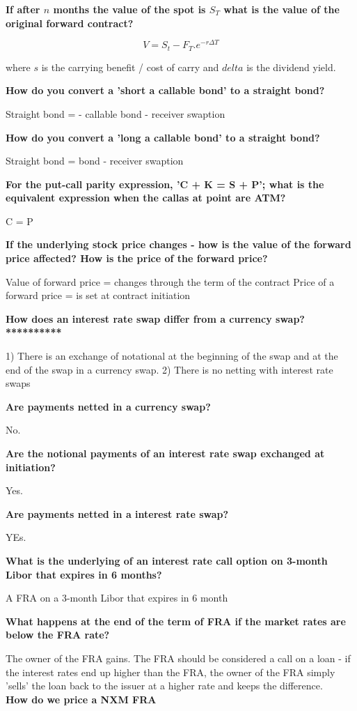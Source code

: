\documentclass[12pt]{article}
\begin{document}
\begin{framed}
		\textbf{If after $n$ months the value of the spot is $S_T$ what is the value of the original forward contract?}
	
	$$
	V = S_t - F_T.e^{-r\Delta T}
	$$
	
	where $s$ is the carrying benefit / cost of carry and $delta$ is the dividend yield. 
	
	
	\textbf{How do you convert a 'short a callable bond' to a straight bond?}
	
	Straight bond = -  callable bond  - receiver swaption
	
		\textbf{How do you convert a 'long a callable bond' to a straight bond?}
	
	Straight bond =  bond  - receiver swaption
	
	
\end{framed}

\textbf{For the put-call parity expression, 'C + K = S + P'; what is the equivalent expression when the callas at point are ATM?}

C = P 

\textbf{If the underlying stock price changes - how is the value of the forward price affected? How is the price of the forward price?}

Value of forward price = changes  through the term of the contract
Price of a forward price = is set at contract initiation

\textbf{How does an interest rate swap differ from a currency swap? **********}

1) There is an exchange of notational at the beginning of the swap and at the end of the swap in a currency swap. 
2) There is no netting with interest rate swaps

\textbf{Are payments netted in a currency swap?}

No. 	

\textbf{Are the notional payments of an interest rate swap exchanged at initiation?}

Yes. 

\textbf{Are payments netted in a interest rate swap?}

YEs.

\textbf{What is the underlying of an interest rate call option on 3-month Libor that expires in 6 months?}

A FRA on a 3-month Libor that expires in 6 month

\textbf{What happens at the end of the term of FRA if the market rates are below the FRA rate?}

The owner of the FRA gains. The FRA should be considered a call on a loan - if the interest rates end up higher than the FRA, the owner of the FRA simply 'sells' the loan back to the issuer at a higher rate and keeps the difference.  \\
\textbf{How do we price a NXM FRA}
\end{document}
